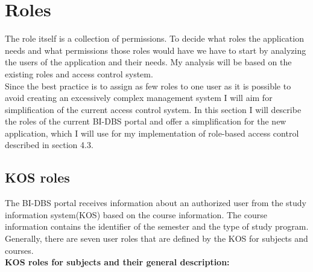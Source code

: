 \section{Roles} The role itself is a collection of permissions. To decide what roles the application needs and what permissions those roles would have we have to start by analyzing the users of the application and their needs. My analysis will be based on the existing roles and access control system.\\
Since the best practice is to assign as few roles to one user as it is possible to avoid creating an excessively complex management system I will aim for simplification of the current access control system. In this section I will describe the roles of the current BI-DBS portal and offer a simplification for the new application, which I will use for my implementation of role-based access control described in section 4.3.

\subsection{KOS roles}
The BI-DBS portal receives information about an authorized user from the study information system(KOS) based on the course information. The course information contains the identifier of the semester and the type of study program. Generally, there are seven user roles that are defined by the KOS for subjects and courses.\cite{kosapi}\\

\noindent \textbf{KOS roles for subjects and their general description:\cite{usermapapi}}

